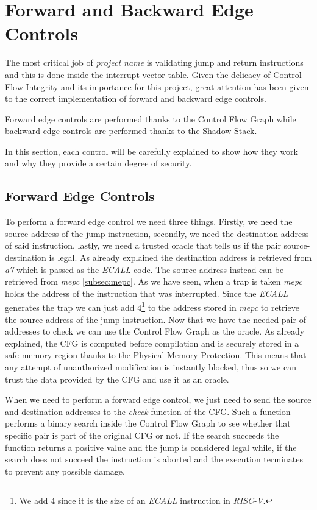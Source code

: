 \section{Forward and Backward Edge Controls}
\label{sec:project_controls}

The most critical job of \textit{project name} is validating jump and return
instructions and this is done inside the interrupt vector table. Given the delicacy
of Control Flow Integrity and its importance for this project, great attention
has been given to the correct implementation of forward and backward edge
controls.

Forward edge controls are performed thanks to the Control Flow Graph while
backward edge controls are performed thanks to the Shadow Stack.

In this section, each control will be carefully explained to show how they work and
why they provide a certain degree of security.

\subsection{Forward Edge Controls}
\label{subsec:forward}

To perform a forward edge control we need three things. Firstly, we need the
source address of the jump instruction, secondly, we need the destination
address of said instruction, lastly, we need a trusted oracle that tells us if
the pair source-destination is legal. As already explained the destination address
is retrieved from \textit{a7} which is passed as the \textit{ECALL} code. The
source address instead can be retrieved from \textit{mepc} \ref{subsec:mepc}. As
we have seen, when a trap is taken \textit{mepc} holds the address of the
instruction that was interrupted. Since the \textit{ECALL} generates the trap we
can just add $4$\footnote{We add $4$ since it is the size of an \textit{ECALL} instruction
in \textit{RISC-V}.} to the address stored in \textit{mepc} to retrieve the
source address of the jump instruction. Now that we have the needed pair of addresses
to check we can use the Control Flow Graph as the oracle. As already explained, the
CFG is computed before compilation and is securely stored in a safe memory region
thanks to the Physical Memory Protection. This means that any attempt of
unauthorized modification is instantly blocked, thus so we can trust the data provided
by the CFG and use it as an oracle.

When we need to perform a forward edge control, we just need to send the source
and destination addresses to the \textit{check} function of the CFG. Such a
function performs a binary search inside the Control Flow Graph to see whether
that specific pair is part of the original CFG or not. If the search succeeds the
function returns a positive value and the jump is considered legal while, if the
search does not succeed the instruction is aborted and the execution terminates
to prevent any possible damage.

